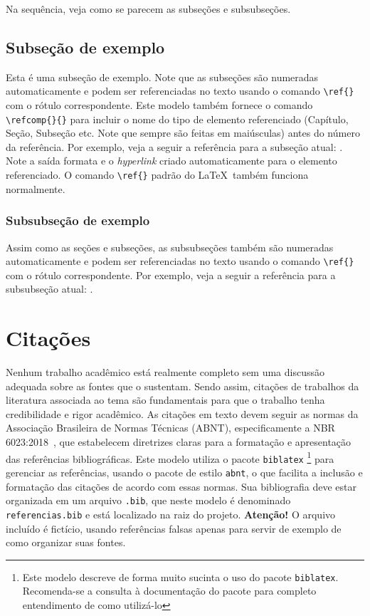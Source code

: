 Na sequência, veja como se parecem as subseções e subsubseções.

\subsection{Subseção de exemplo}\label{ssc:exemplo}

Esta é uma subseção de exemplo. Note que as subseções são numeradas automaticamente e podem ser
referenciadas no texto usando o comando \verb|\ref{}| com o rótulo correspondente. Este modelo
também fornece o comando \verb"\refcomp{}{}" para incluir o nome do tipo de elemento referenciado
(Capítulo, Seção, Subseção etc. Note que sempre são feitas em maiúsculas) antes do número da
referência. Por exemplo, veja a seguir a referência para a subseção atual:
. Note a saída formata e o \emph{hyperlink} criado automaticamente
para o elemento referenciado. O comando \verb"\ref{}" padrão do \LaTeX\ também funciona normalmente.

\subsubsection{Subsubseção de exemplo}\label{sss:exemplo}

Assim como as seções e subseções, as subsubseções também são numeradas automaticamente e podem ser
referenciadas no texto usando o comando \verb|\ref{}| com o rótulo correspondente. Por exemplo, veja
a seguir a referência para a subsubseção atual: .

\section{Citações}

Nenhum trabalho acadêmico está realmente completo sem uma discussão adequada sobre as fontes que o
sustentam. Sendo assim, citações de trabalhos da literatura associada ao tema são fundamentais para
que o trabalho tenha credibilidade e rigor acadêmico. As citações em texto devem seguir as normas da
Associação Brasileira de Normas Técnicas (ABNT), especificamente a NBR
6023:2018~\cite{nbr6023:2018}, que estabelecem diretrizes claras para a formatação
e apresentação das referências bibliográficas. Este modelo utiliza o pacote \texttt{biblatex}%
%
\footnote{Este modelo descreve de forma muito sucinta o uso do pacote \texttt{biblatex}.
    Recomenda-se a consulta à documentação do pacote para completo entendimento de como utilizá-lo}%
%
 para gerenciar as referências, usando o pacote de estilo \texttt{abnt}, o que facilita a inclusão e
formatação das citações de acordo com essas normas. Sua bibliografia deve estar organizada em um
arquivo \texttt{.bib}, que neste modelo é denominado \texttt{referencias.bib} e está localizado na
raiz do projeto. \textbf{Atenção!}  O arquivo incluído é fictício, usando referências falsas apenas
para servir de exemplo de como organizar suas fontes.

